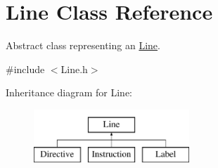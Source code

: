 \hypertarget{class_line}{}\section{Line Class Reference}
\label{class_line}


Abstract class representing an \hyperlink{class_line}{Line}.  




{\ttfamily \#include $<$Line.\+h$>$}

Inheritance diagram for Line\+:\begin{figure}[H]
\begin{center}
\leavevmode
\includegraphics[height=2.000000cm]{class_line}
\end{center}
\end{figure}
